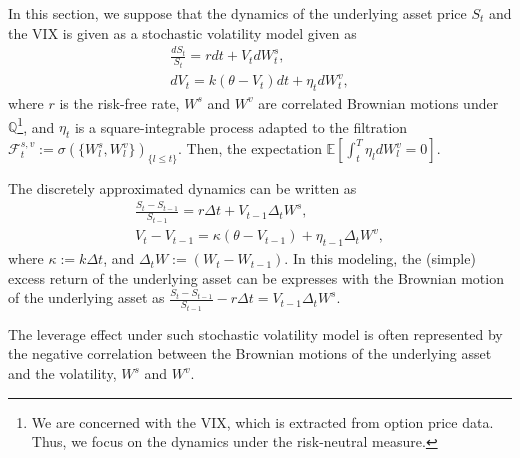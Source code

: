 In this section, we suppose that the dynamics of the underlying asset price $S_t$ and the VIX is given as a stochastic volatility model given as
\begin{equation} \label{eqn: stoch vol model}
\begin{gathered}
\frac{dS_t}{S_t} = r dt + V_t dW^s_t, \\
dV_t = k \left( \theta - V_t \right) dt + \eta_t dW^v_t,
\end{gathered}
\end{equation}
where $r$ is the risk-free rate, $W^s$ and $W^v$ are correlated Brownian motions under $\mathbb{Q}$\footnote{We are concerned with the VIX, which is extracted from option price data. Thus, we focus on the dynamics under the risk-neutral measure.}, and $\eta_t$ is a square-integrable process adapted to the filtration $\mathcal{F}^{s, v}_t := \sigma (\{W^s_l, W^v_l \})_{\{l\leq t \}}$. Then, the expectation $\mathbb{E} [\int_t^T \eta_l dW_l^v=0]$.


The discretely approximated dynamics can be written as 
\begin{equation}
\begin{gathered}
\frac{S_{t} - S_{t-1}}{S_{t-1}} = r \Delta t + V_{t-1} \Delta_t W^s, \\
V_{t} - V_{t-1} = \kappa \left( \theta - V_{t-1} \right) + \eta_{t-1}  \Delta_t W^v,
\end{gathered}
\end{equation}
where $\kappa := k \Delta t$, and $\Delta_t W := \left( W_t - W_{t-1} \right)$. In this modeling, the (simple) excess return of the underlying asset can be expresses with the Brownian motion of the underlying asset as $\frac{S_{t} - S_{t-1}}{S_{t-1}} - r \Delta t = V_{t-1} \Delta_t W^s$.

The leverage effect under such stochastic volatility model is often represented by the negative correlation between the Brownian motions of the underlying asset and the volatility, $W^s$ and $W^v$.

